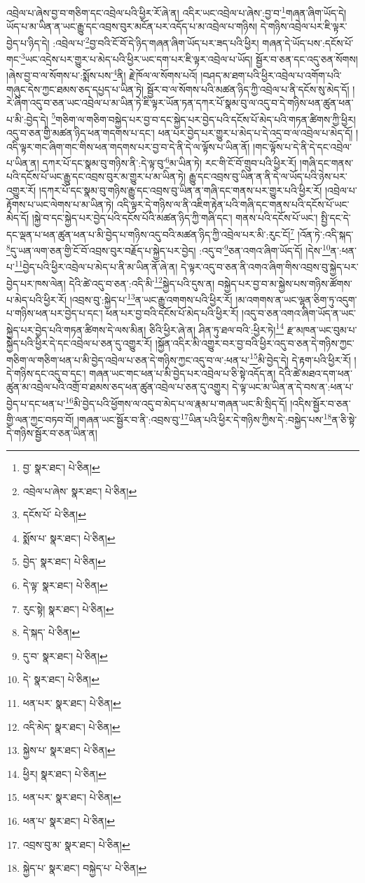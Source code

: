 འབྲེལ་པ་ཞེས་བྱ་བ་གཅིག་དང་འབྲེལ་པའི་ཕྱིར་རོ་ཞེ་ན། འདིར་ཡང་འབྲེལ་པ་ཞེས་:བྱ་བ་\footnote{བྱ་  སྣར་ཐང་།  པེ་ཅིན། }གཞན་ཞིག་ཡོད་དེ། ཡོད་པ་མ་ཡིན་ན་ཡང་རྒྱུ་དང་འབྲས་བུར་མངོན་པར་འདོད་པ་མ་འབྲེལ་པ་གཉིས། དེ་གཉིས་འབྲེལ་པར་ཇི་ལྟར་བྱེད་པ་ཉིད་དེ། :འབྲེལ་པ་\footnote{འབྲེལ་པ་ཞེས་  སྣར་ཐང་།  པེ་ཅིན། }བྱ་བའི་ངོ་བོ་དེ་ཉིད་གཞན་ཞིག་ཡོད་པར་ཟད་པའི་ཕྱིར། གཞན་དེ་ཡོད་པས་:དངོས་པོ་གང་\footnote{དངོས་པོ་  པེ་ཅིན། }ཡང་འདྲེས་པར་གྱུར་པ་མེད་པའི་ཕྱིར་ཡང་དག་པར་ཇི་ལྟར་འབྲེལ་པ་ཡོད། སྦྱོར་བ་ཅན་དང་འདུ་ཅན་སོགས། །ཞེས་བྱ་བ་ལ་སོགས་པ་:སྨོས་པས་\footnote{སྨོས་པ་  སྣར་ཐང་།  པེ་ཅིན། }ནི། རྗེ་ཁོལ་ལ་སོགས་པའོ། །བཤད་མ་ཐག་པའི་ཕྱིར་འབྲེལ་པ་འགོག་པའི་གཞུང་དེས་ཀྱང་ཐམས་ཅད་དཔྱད་པ་ཡིན་ཏེ། སྦྱོར་བ་ལ་སོགས་པའི་མཚན་ཉིད་ཀྱི་འབྲེལ་པ་ནི་དངོས་སུ་མེད་དོ། །རེ་ཞིག་འདུ་བ་ཅན་ཡང་འབྲེལ་པ་མ་ཡིན་ཏེ་ཇི་ལྟར་ཡོན་ཏན་དཀར་པོ་སྣམ་བུ་ལ་འདུ་བ་དེ་གཉིས་ཕན་ཚུན་ཕན་པ་མི་:བྱེད་དེ། \footnote{བྱེད་  སྣར་ཐང་།  པེ་ཅིན། }གཅིག་ལ་གཅིག་བསྐྱེད་པར་བྱ་བ་དང་སྐྱེད་པར་བྱེད་པའི་དངོས་པོ་མེད་པའི་གཏན་ཚིགས་ཀྱི་ཕྱིར། འདུ་བ་ཅན་གྱི་མཚན་ཉིད་ཕན་གདགས་པ་དང་། ཕན་པར་བྱེད་པར་གྱུར་པ་མེད་པ་དེ་འདྲ་བ་ལ་འབྲེལ་པ་མེད་དོ། །འདི་ལྟར་གང་ཞིག་གང་གིས་ཕན་གདགས་པར་བྱ་བ་དེ་ནི་དེ་ལ་ལྟོས་པ་ཡིན་ནོ། །གང་ལྟོས་པ་དེ་ནི་དེ་དང་འབྲེལ་པ་ཡིན་ན། དཀར་པོ་དང་སྣམ་བུ་གཉིས་ནི་:དེ་ལྟ་བུ་\footnote{དེ་ལྟ་  སྣར་ཐང་།  པེ་ཅིན། }མ་ཡིན་ཏེ། རང་གི་ངོ་བོ་གྲུབ་པའི་ཕྱིར་རོ། །གཞི་དང་གནས་པའི་དངོས་པོ་ཡང་རྒྱུ་དང་འབྲས་བུར་མ་གྱུར་པ་མ་ཡིན་ཏེ། རྒྱུ་དང་འབྲས་བུ་ཡིན་ན་ནི་དེ་ལ་ཡོད་པའི་ཉེས་པར་འགྱུར་རོ། །དཀར་པོ་དང་སྣམ་བུ་གཉིས་རྒྱུ་དང་འབྲས་བུ་ཡིན་ན་གཞི་དང་གནས་པར་གྱུར་པའི་ཕྱིར་རོ། །འབྲེལ་པ་རྟོགས་པ་ཡང་ལེགས་པ་མ་ཡིན་ཏེ། འདི་ལྟར་དེ་གཉིས་ལ་ནི་འཇིག་རྟེན་པའི་གཞི་དང་གནས་པའི་དངོས་པོ་ཡང་མེད་དོ། །སྐྱེ་བ་དང་སྐྱེད་པར་བྱེད་པའི་དངོས་པོའི་མཚན་ཉིད་ཀྱི་གཞི་དང་། གནས་པའི་དངོས་པོ་ཡང་། སྤྱི་དང་དེ་དང་ལྡན་པ་ཕན་ཚུན་ཕན་པ་མི་བྱེད་པ་གཉིས་འདུ་བའི་མཚན་ཉིད་ཀྱི་འབྲེལ་པར་མི་:རུང་ངོ།\footnote{རུང་སྟེ།  སྣར་ཐང་།  པེ་ཅིན། } །འོན་ཏེ་:འདི་སྐད་\footnote{དེ་སྐད་  པེ་ཅིན། }དུ་ཡན་ལག་ཅན་གྱི་ངོ་བོ་འབྲས་བུར་བརྗོད་པ་སྐྱེད་པར་བྱེད། :འདུ་བ་\footnote{དུ་བ་  སྣར་ཐང་།  པེ་ཅིན། }ཅན་འགའ་ཞིག་ཡོད་དོ། །དེས་\footnote{དེ་  སྣར་ཐང་།  པེ་ཅིན། }ན་:ཕན་པ་\footnote{ཕན་པར་  སྣར་ཐང་།  པེ་ཅིན། }བྱེད་པའི་ཕྱིར་འབྲེལ་པ་མེད་པ་ནི་མ་ཡིན་ནོ་ཞེ་ན། དེ་ལྟར་འདུ་བ་ཅན་ནི་འགའ་ཞིག་གིས་འབྲས་བུ་སྐྱེད་པར་བྱེད་པར་ཁས་ལེན། དེའི་ཚེ་འདུ་བ་ཅན་:འདི་མི་\footnote{འདི་མེད་  སྣར་ཐང་།  པེ་ཅིན། }སྐྱེད་པའི་དུས་ན། བསྐྱེད་པར་བྱ་བ་མ་སྐྱེས་པས་གཉིས་ཚོགས་པ་མེད་པའི་ཕྱིར་རོ། །འབྲས་བུ་:སྐྱེད་པ་\footnote{སྐྱེས་པ་  སྣར་ཐང་།  པེ་ཅིན། }ན་ཡང་རྒྱུ་འགགས་པའི་ཕྱིར་རོ། །མ་འགགས་ན་ཡང་ལྷན་ཅིག་ཏུ་འདུག་པ་གཉིས་ཕན་པར་བྱེད་པ་དང་། ཕན་པར་བྱ་བའི་དངོས་པོ་མེད་པའི་ཕྱིར་རོ། །འདུ་བ་ཅན་འགའ་ཞིག་ཡོད་ན་ཡང་སྐྱེད་པར་བྱེད་པའི་གཏན་ཚིགས་དེ་ལས་མིན། ཅིའི་ཕྱིར་ཞེ་ན། ཤིན་ཏུ་ཐལ་བའི་:ཕྱིར་ཏེ།\footnote{ཕྱིར།  སྣར་ཐང་།  པེ་ཅིན། } རྫ་མཁན་ཡང་བུམ་པ་སྐྱེད་པའི་ཕྱིར་དེ་དང་འབྲེལ་པ་ཅན་དུ་འགྱུར་རོ། །སྐྱོན་འདིར་མི་འགྱུར་བར་བྱ་བའི་ཕྱིར་འདུ་བ་ཅན་དེ་གཉིས་ཀྱང་གཅིག་ལ་གཅིག་ཕན་པ་མི་བྱེད་འབྲེལ་པ་ཅན་དེ་གཉིས་ཀྱང་འདུ་བ་ལ་:ཕན་པ་\footnote{ཕན་པར་  སྣར་ཐང་།  པེ་ཅིན། }མི་བྱེད་དེ། དེ་རྟག་པའི་ཕྱིར་རོ། །དེ་གཉིས་དང་འདུ་བ་དང་། གཞན་ཡང་གང་ཕན་པ་མི་བྱེད་པར་འབྲེལ་པ་ཅི་སྟེ་འདོད་ན། དེའི་ཚེ་མཐའ་དག་ཕན་ཚུན་མ་འབྲེལ་པའི་འགྲོ་བ་ཐམས་ཅད་ཕན་ཚུན་འབྲེལ་པ་ཅན་དུ་འགྱུར། དེ་ལྟ་ཡང་མ་ཡིན་ན་དེ་བས་ན་:ཕན་པ་བྱེད་པ་དང་ཕན་པ་\footnote{ཕན་པ་  སྣར་ཐང་།  པེ་ཅིན། }མི་བྱེད་པའི་ཕྱོགས་ལ་འདུ་བ་མེད་པ་ལ་རྣམ་པ་གཞན་ཡང་མི་སྲིད་དོ། །འདིས་སྦྱོར་བ་ཅན་གྱི་ལན་ཀྱང་བཏབ་བོ། །གཞན་ཡང་སྦྱོར་བ་ནི་:འབྲས་བུ་\footnote{འབྲས་བུ་མ་  སྣར་ཐང་།  པེ་ཅིན། }ཡིན་པའི་ཕྱིར་དེ་གཉིས་ཀྱིས་དེ་:བསྐྱེད་པས་\footnote{སྐྱེད་པ་  སྣར་ཐང་། བསྐྱེད་པ་  པེ་ཅིན། }ན་ཅི་སྟེ་དེ་གཉིས་སྦྱོར་བ་ཅན་ཡིན་ན། 